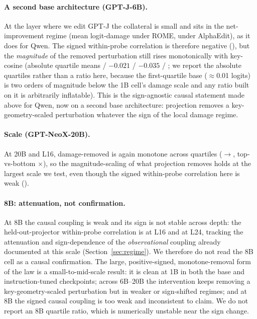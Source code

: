 \paragraph{A second base architecture (GPT-J-6B).} At the layer where we edit
GPT-J the collateral is small and sits in the net-improvement regime (mean
logit-damage \gptjDmgRome{} under ROME, \gptjDmgAlpha{} under AlphaEdit), as
it does for Qwen. The signed within-probe correlation is therefore negative
(\gptjCausalRho{}), but the \emph{magnitude} of the removed perturbation still
rises monotonically with key-cosine (absolute quartile means
\gptjQuartLo{} / $-0.021$ / $-0.035$ / \gptjQuartHi{}; we report the absolute
quartiles rather than a ratio here, because the first-quartile base
($\approx$0.01 logits) is two orders of magnitude below the 1B cell's damage
scale and any ratio built on it is arbitrarily inflatable).
This is the sign-agnostic causal statement made above for Qwen, now on a
second base architecture: projection removes a key-geometry-scaled
perturbation whatever the sign of the local damage regime.

\paragraph{Scale (GPT-NeoX-20B).} At 20B and L16, damage-removed is again
monotone across quartiles (\neoxQuartLo{}$\rightarrow$\neoxQuartHi{},
top-vs-bottom \neoxRatio{}$\times$), so the magnitude-scaling of what
projection removes holds at the largest scale we test, even though the signed
within-probe correlation here is weak (\neoxCausalRho{}).

\paragraph{8B: attenuation, not confirmation.} At 8B the causal coupling is
weak and its sign is not stable across depth: the held-out-projector
within-probe correlation is \eightbCausalRhoLsixteen{} at L16 and
\eightbCausalRhoLtwentyfour{} at L24, tracking the attenuation and
sign-dependence of the \emph{observational} coupling already documented at
this scale (Section~\ref{sec:regime}). We therefore do not read the 8B cell as
a causal confirmation. The large, positive-signed, monotone-removal form of
the law is a small-to-mid-scale result: it is
clean at 1B in both the base and instruction-tuned checkpoints; across 6B--20B
the intervention keeps removing a key-geometry-scaled perturbation but in
weaker or sign-shifted regimes; and at 8B the signed causal coupling is too
weak and inconsistent to claim. We do not report an 8B quartile ratio, which
is numerically unstable near the sign change.

